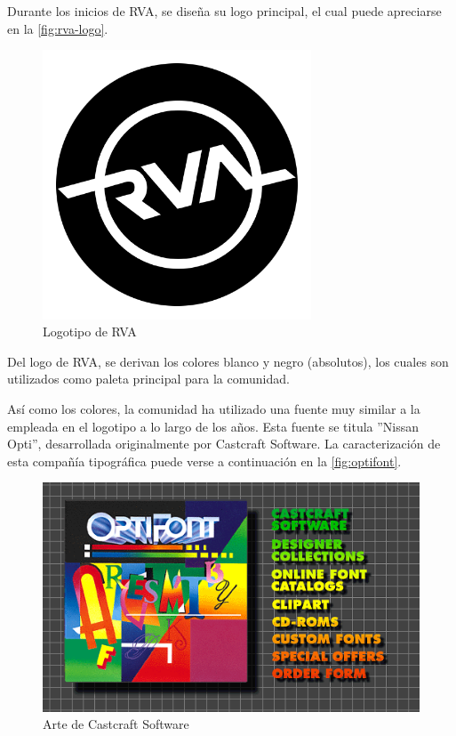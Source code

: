 Durante los inicios de RVA, se diseña su logo principal, el cual puede apreciarse en la \autoref{fig:rva-logo}.

\begin{figure}[H]
  \begin{center}
    \includegraphics[width=8cm, height=8cm]{img/rva.png} 
  \end{center}
  \caption[Logotipo de RVA]{Logotipo de RVA}
  \label{fig:rva-logo}
\end{figure}

Del logo de RVA, se derivan los colores blanco y negro (absolutos), los cuales son utilizados como paleta principal para la comunidad.

Así como los colores, la comunidad ha utilizado una fuente muy similar a la empleada en el logotipo a lo largo de los años. Esta fuente se titula ''Nissan Opti'', desarrollada originalmente por Castcraft Software. La caracterización de esta compañía tipográfica puede verse a continuación en la \autoref{fig:optifont}.

\begin{figure}[H]
  \begin{center}
    \includegraphics{img/optifont.png} 
  \end{center}
  \caption[Arte de Castcraft Software]{Arte de Castcraft Software}
  \label{fig:optifont}
\end{figure}

